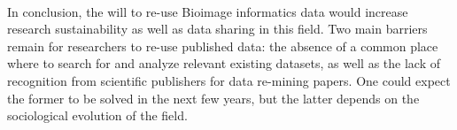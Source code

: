 \documentclass[12pt]{article}
\begin{document}
\paragraph*{}
In conclusion, the will to re-use Bioimage informatics data would increase research sustainability as well as data sharing in this field. Two main barriers remain for researchers to re-use published data: the absence of a common place where to search for and analyze relevant existing datasets, as well as the lack of recognition from scientific publishers for data re-mining papers. One could expect the former to be solved in the next few years, but the latter depends on the sociological evolution of the field.


{}
\end{document}
